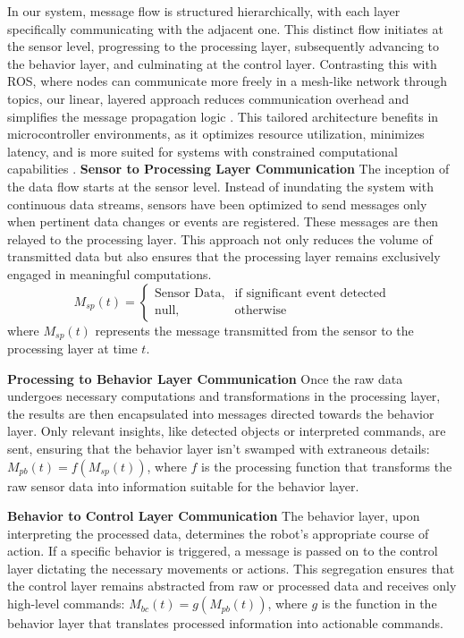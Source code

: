 \documentclass[runningheads]{llncs}
\begin{document}
In our system, message flow is structured hierarchically, with each layer specifically communicating with the adjacent one. This distinct flow initiates at the sensor level, progressing to the processing layer, subsequently advancing to the behavior layer, and culminating at the control layer. Contrasting this with ROS, where nodes can communicate more freely in a mesh-like network through topics, our linear, layered approach reduces communication overhead and simplifies the message propagation logic \cite{Quigley2009}. This tailored architecture benefits in microcontroller environments, as it optimizes resource utilization, minimizes latency, and is more suited for systems with constrained computational capabilities \cite{Ahn2009}. 
\noindent\textbf{Sensor to Processing Layer Communication}
The inception of the data flow starts at the sensor level. Instead of inundating the system with continuous data streams, sensors have been optimized to send messages only when pertinent data changes or events are registered. These messages are then relayed to the processing layer. This approach not only reduces the volume of transmitted data but also ensures that the processing layer remains exclusively engaged in meaningful computations.
\begin{equation}
M_{sp}(t) = \begin{cases} 
    \text{Sensor Data,} & \text{if significant event detected} \\
    \text{null,} & \text{otherwise}
\end{cases}
\end{equation}
where \(M_{sp}(t)\) represents the message transmitted from the sensor to the processing layer at time \(t\).

\vspace{0.5cm}
\noindent\textbf{Processing to Behavior Layer Communication}
Once the raw data undergoes necessary computations and transformations in the processing layer, the results are then encapsulated into messages directed towards the behavior layer. Only relevant insights, like detected objects or interpreted commands, are sent, ensuring that the behavior layer isn't swamped with extraneous details: 
$M_{pb}(t) = f(M_{sp}(t))$, 
where \(f\) is the processing function that transforms the raw sensor data into information suitable for the behavior layer.

\vspace{0.5cm}
\noindent\textbf{Behavior to Control Layer Communication}
The behavior layer, upon interpreting the processed data, determines the robot's appropriate course of action. If a specific behavior is triggered, a message is passed on to the control layer dictating the necessary movements or actions. This segregation ensures that the control layer remains abstracted from raw or processed data and receives only high-level commands:
$M_{bc}(t) = g(M_{pb}(t))$, where \(g\) is the function in the behavior layer that translates processed information into actionable commands.
\end{document}
